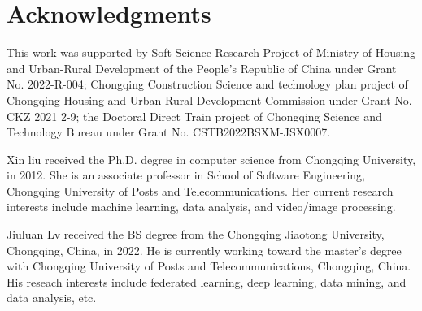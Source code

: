 \documentclass[10pt,journal,compsoc]{IEEEtran}
\begin{document}
\section*{Acknowledgments}
This work was supported by Soft Science Research Project of Ministry of Housing and Urban-Rural Development of the People’s Republic of China under Grant No. 2022-R-004; Chongqing Construction Science and technology plan project of Chongqing Housing and Urban-Rural Development Commission under Grant No. CKZ 2021 2-9; the Doctoral Direct Train project of Chongqing Science and Technology Bureau under Grant No. CSTB2022BSXM-JSX0007.




\begin{IEEEbiography}{Xin liu}
	received the Ph.D. degree in computer science from Chongqing University, in 2012. She is an associate professor in School of Software Engineering, Chongqing University of Posts and Telecommunications. Her current research interests include machine learning, data analysis, and video/image processing.
\end{IEEEbiography}


\begin{IEEEbiography}{Jiuluan Lv}
	received the BS degree from the Chongqing Jiaotong University, Chongqing, China, in 2022. He is currently working toward the master's degree with Chongqing University of Posts and Telecommunications, Chongqing, China. His reseach interests include federated learning, deep learning, data mining, and data analysis, etc. 
\end{IEEEbiography}
\end{document}
